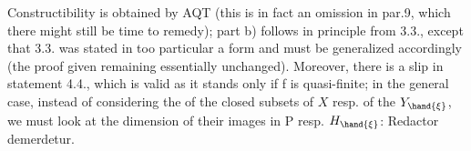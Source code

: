 
Constructibility is obtained by AQT (this is in fact an omission in
par.9, which there might still be time to remedy); part b)
follows in principle from 3.3., except that 3.3. was stated in too
particular a form and must be generalized accordingly (the proof
given remaining essentially unchanged). Moreover, there
is a slip in statement 4.4., which is valid as it stands only if f
is quasi-finite; in the general case, instead of considering the 
of the closed subsets of $X$ resp. of the $Y_{\hand{\xi}}$, we must look at the dimension
of their images in P resp. $H_{\hand{\xi}}$: Redactor demerdetur.

